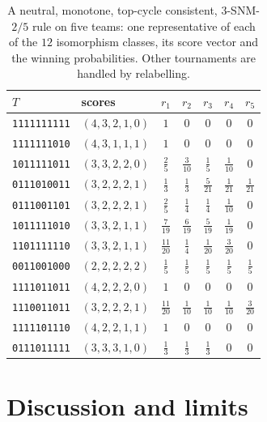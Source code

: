 \documentclass[11pt]{amsart}
\theoremstyle{definition}
\theoremstyle{remark}
\begin{document}
\begin{table}[ht]
\centering\small\renewcommand{\arraystretch}{1.35}
\begin{tabular}{llccccc}
\toprule
$T$ & scores & $r_1$ & $r_2$ & $r_3$ & $r_4$ & $r_5$\\
\midrule
\texttt{1111111111} & $(4,3,2,1,0)$ & $1$ & $0$ & $0$ & $0$ & $0$ \\
\texttt{1111111010} & $(4,3,1,1,1)$ & $1$ & $0$ & $0$ & $0$ & $0$ \\
\texttt{1011111011} & $(3,3,2,2,0)$ & $\tfrac{2}{5}$ & $\tfrac{3}{10}$ & $\tfrac{1}{5}$ & $\tfrac{1}{10}$ & $0$ \\
\texttt{0111010011} & $(3,2,2,2,1)$ & $\tfrac{1}{3}$ & $\tfrac{1}{3}$ & $\tfrac{5}{21}$ & $\tfrac{1}{21}$ & $\tfrac{1}{21}$ \\
\texttt{0111001101} & $(3,2,2,2,1)$ & $\tfrac{2}{5}$ & $\tfrac{1}{4}$ & $\tfrac{1}{4}$ & $\tfrac{1}{10}$ & $0$ \\
\texttt{1011111010} & $(3,3,2,1,1)$ & $\tfrac{7}{19}$ & $\tfrac{6}{19}$ & $\tfrac{5}{19}$ & $\tfrac{1}{19}$ & $0$ \\
\texttt{1101111110} & $(3,3,2,1,1)$ & $\tfrac{11}{20}$ & $\tfrac{1}{4}$ & $\tfrac{1}{20}$ & $\tfrac{3}{20}$ & $0$ \\
\texttt{0011001000} & $(2,2,2,2,2)$ & $\tfrac{1}{5}$ & $\tfrac{1}{5}$ & $\tfrac{1}{5}$ & $\tfrac{1}{5}$ & $\tfrac{1}{5}$ \\
\texttt{1111011011} & $(4,2,2,2,0)$ & $1$ & $0$ & $0$ & $0$ & $0$ \\
\texttt{1110011011} & $(3,2,2,2,1)$ & $\tfrac{11}{20}$ & $\tfrac{1}{10}$ & $\tfrac{1}{10}$ & $\tfrac{1}{10}$ & $\tfrac{3}{20}$ \\
\texttt{1111101110} & $(4,2,2,1,1)$ & $1$ & $0$ & $0$ & $0$ & $0$ \\
\texttt{0111011111} & $(3,3,3,1,0)$ & $\tfrac{1}{3}$ & $\tfrac{1}{3}$ & $\tfrac{1}{3}$ & $0$ & $0$ \\
\bottomrule
\end{tabular}
\caption{A neutral, monotone, top-cycle consistent, $3$-SNM-$2/5$ rule on five teams: one representative of each of the $12$ isomorphism classes, its score vector and the winning probabilities. Other tournaments are handled by relabelling.}
\label{tab:n5}
\end{table}

\section{Discussion and limits}\label{sec:discussion}
\end{document}
